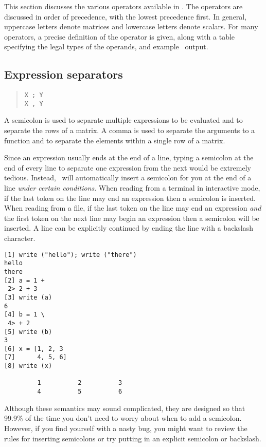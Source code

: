 This section discusses the various operators available in \burlap.
The operators are discussed in order of precedence, with the lowest
precedence first.  In general, uppercase letters denote matrices and
lowercase letters denote scalars.  For many operators, a precise
definition of the operator is given, along with a table specifying the
legal types of the operands, and example \burlap\ output.


\subsection{Expression separators}
\label{burlap.op.separators}

\begin{quote}
\begin{verbatim}
X ; Y
X , Y
\end{verbatim}
\end{quote}

A semicolon is used to separate multiple expressions to be evaluated
and to separate the rows of a matrix.  A comma is used to separate the
arguments to a function and to separate the elements within a single
row of a matrix.

Since an expression usually ends at the end of a line, typing a
semicolon at the end of every line to separate one expression from the
next would be extremely tedious.  Instead, \burlap\ will automatically
insert a semicolon for you at the end of a line {\em under certain
conditions}.  When reading from a terminal in interactive mode, if the
last token on the line may end an expression then a semicolon is
inserted.  When reading from a file, if the last token on the line may
end an expression {\em and} the first token on the next line may begin
an expression then a semicolon will be inserted.  A line can be
explicitly continued by ending the line with a backslash character.

\begin{screen}
\begin{verbatim}
[1] write ("hello"); write ("there")
hello
there
[2] a = 1 +   
 2> 2 + 3
[3] write (a)
6
[4] b = 1 \
 4> + 2
[5] write (b)
3
[6] x = [1, 2, 3
[7]      4, 5, 6]
[8] write (x)

         1          2          3 
         4          5          6 
\end{verbatim}
\end{screen}

Although these semantics may sound complicated, they are designed so
that 99.9\% of the time you don't need to worry about when to add a
semicolon.  However, if you find yourself with a nasty bug, you might
want to review the rules for inserting semicolons or try putting in an
explicit semicolon or backslash.


